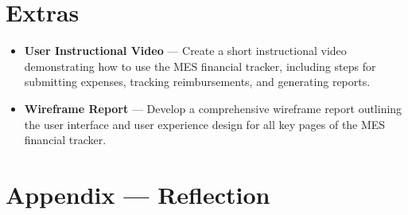 \documentclass{article}
\begin{document}
\section{Extras}

\begin{itemize}
\item \textbf{User Instructional Video} — Create a short instructional video demonstrating how to use the MES financial tracker, including steps for submitting expenses, tracking reimbursements, and generating reports.
\item \textbf{Wireframe Report} — Develop a comprehensive wireframe report outlining the user interface and user experience design for all key pages of the MES financial tracker.
\end{itemize}

\newpage{}

\section*{Appendix --- Reflection}


\end{document}
